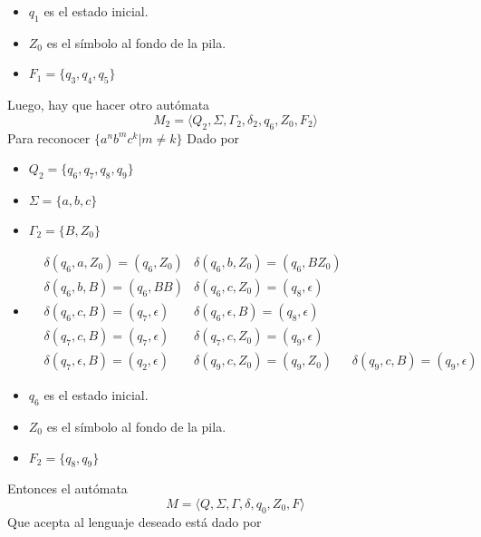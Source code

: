 \documentclass{article}
\begin{document}
\begin{enumerate}
{\begin{enumerate}
{\begin{itemize}
	         	
	         	\item {
	         		$q_1$ es el estado inicial.
	         	}
	         	\item {
	         		$Z_0$ es el símbolo al fondo de la pila.
	         	}
	         	\item {
	         		$F_1 = \{q_3, q_4, q_5\}$
	         	}
	         \end{itemize}
	     
	     	Luego, hay que hacer otro autómata 
	     	\[M_2 = \langle Q_2 , \Sigma, \Gamma_2 , \delta_2, q_6 , Z_0,
	     	F_2\rangle\]
	     	Para reconocer $\{a^nb^mc^k | m \neq k\}$
	     	Dado por 
	     	\begin{itemize}
	     		\item {
	     			$Q_2 = \{q_6, q_7, q_8, q_9\}$
     			}
     		
     			\item {
     				$\Sigma = \{a, b, c\}$
     			}
     			\item {
     				$\Gamma_2 = \{B, Z_0\}$
     			}
	     		\item {
	     			\begin{align*}
	     			&\delta (q_6, a, Z_0) = (q_6, Z_0)
	     			&\delta (q_6, b, Z_0) = (q_6, BZ_0) \\
	     			&\delta (q_6, b, B) = (q_6, BB)
	     			&\delta (q_6, c, Z_0) = (q_8, \epsilon) \\
	     			&\delta (q_6, c, B) = (q_7, \epsilon)
	     			&\delta (q_6, \epsilon, B) = (q_8, \epsilon) \\
	     			&\delta (q_7, c, B) = (q_7, \epsilon)
	     			&\delta (q_7, c, Z_0) = (q_9, \epsilon) \\
	     			&\delta (q_7, \epsilon, B) = (q_2, \epsilon)
	     			&\delta (q_9, c, Z_0) = (q_9, Z_0)
	     			&\delta (q_9, c, B) = (q_9, \epsilon)
	     			\end{align*}
	     		}
	     		\item {
	     			$q_6$ es el estado inicial.
	     		}
	     		\item {
	     			$Z_0$ es el símbolo al fondo de la pila.
	     		}
	     		\item {
	     			$F_2 = \{q_8, q_9\}$
	     		}
	     	\end{itemize}
	            
	        Entonces el autómata 
	        \[M = \langle Q , \Sigma, \Gamma , \delta, q_0 , Z_0,
	        F\rangle\]
	        Que acepta al lenguaje deseado está dado por
	        
}
\end{enumerate}}
\end{enumerate}
\end{document}
